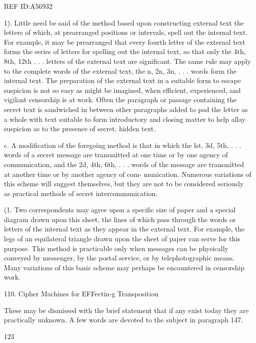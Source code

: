  

REF ID:A56932

1). Little need be said of the method based upon constructing external
text the letters of which, at prearranged positions or intervals, spell out
the internal text. For example, it may be prearranged that every fourth
letter of the external text forms the series of letters for spelling out
the internal text, so that only the 4th, 8th, 12th . . . letters of the external
text are signiﬁcant. The same rule may apply to the complete words of
the external text, the n, 2n, 3n, . . . words form the internal text. The
preparation of the external text in a suitable form to escape suspicion
is not so easy as might be imagined, when efficient, experienced, and
vigilant censorship is at work. Often the paragraph or passage containing
the secret text is sandwiched in between other paragraphs added to pad
the letter as a whole with text suitable to form introductory and closing
matter to help allay suspicion as to the presence of secret, hidden text.

c. A modiﬁcation of the foregoing method is that in which the lst,
3d, 5th, . . . words of a secret message are transmitted at one time or by
one agency of communication, and the 2d, 4th, 6th, . . . words of the
message are transmitted at another time or by another agency of com-
munication. Numerous variations of this scheme will suggest themselves,
but they are not to be considered seriously as practical methods of secret
intercommunication.

(1. Two correspondents may agree upon a speciﬁc size of paper and a
special diagram drawn upon this sheet, the lines of which pass through
the words or letters of the internal text as they appear in the external
text. For example, the legs of an equilateral triangle drawn upon the
sheet of paper can serve for this purpose. This method is practicable
only when messages can be physically conveyed by messenger, by the
postal service, or by telephotographic means. Many variations of this
basic scheme may perhaps be encountered in censorship work.

110. Cipher Machines for EFFectin-g Transposition

These may be dismissed with the brief statement that if any exist
today they are practically unknown. A few words are devoted to the
subject in paragraph 147.

123

 

